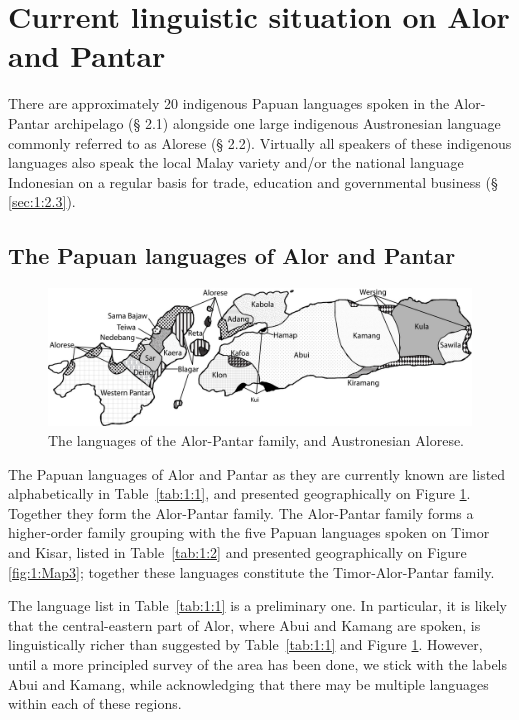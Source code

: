 \section{Current linguistic situation on Alor and Pantar}\label{sec:1:2}
There are approximately 20 indigenous Papuan languages spoken in the Alor-Pantar archipelago ({\S} 2.1) alongside one large indigenous Austronesian language commonly referred to as Alorese ({\S} 2.2). Virtually all speakers of these indigenous languages also speak the local Malay variety and/or the national language Indonesian on a regular basis for trade, education and governmental business ({\S} \ref{sec:1:2.3}). 

\subsection{The Papuan languages of Alor and Pantar} \label{sec:1:2.1}

\begin{figure}[b]
\includegraphics[width=.8\textwidth]{figures/klamer_ch1_fig2.jpg}
\caption{The languages of the Alor-Pantar family, and Austronesian Alorese.}
\label{fig:1:Map2}
\end{figure} 


The Papuan languages of Alor and Pantar as they are currently known are listed alphabetically in Table~\ref{tab:1:1}, and presented geographically on Figure \ref{fig:1:Map2}. Together they form the Alor-Pantar family. The Alor-Pantar family forms a higher-order family grouping with the five Papuan languages spoken on Timor and Kisar, listed in Table~\ref{tab:1:2} and presented geographically on Figure \ref{fig:1:Map3}; together these languages constitute the Timor-Alor-Pantar family.






The language list in Table~\ref{tab:1:1} is a preliminary one. In particular, it is likely that the central-eastern part of Alor, where Abui and Kamang are spoken, is linguistically richer than suggested by Table~\ref{tab:1:1} and Figure \ref{fig:1:Map2}. However, until a more principled survey of the area has been done, we stick with the labels Abui and Kamang, while acknowledging that there may be multiple languages within each of these regions.


